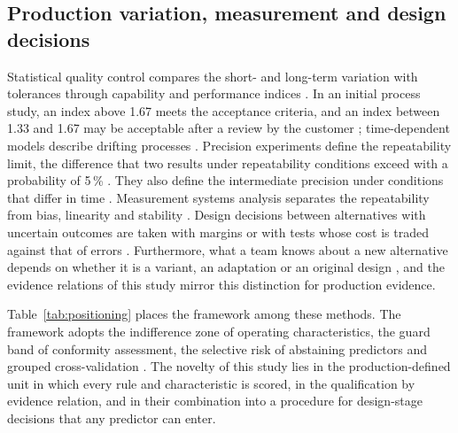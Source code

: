\documentclass[pdflatex,sn-basic,lineno]{sn-jnl}
\begin{document}
\subsection{Production variation, measurement and design decisions}

Statistical quality control compares the short- and long-term variation with tolerances through capability and performance indices \citep{montgomery2019introduction}. In an initial process study, an index above 1.67 meets the acceptance criteria, and an index between 1.33 and 1.67 may be acceptable after a review by the customer \citep{aiag2006production}; time-dependent models describe drifting processes \citep{iso2026process}. Precision experiments define the repeatability limit, the difference that two results under repeatability conditions exceed with a probability of 5\,\% \citep{iso2025repeatability}. They also define the intermediate precision under conditions that differ in time \citep{iso2023intermediate}. Measurement systems analysis separates the repeatability from bias, linearity and stability \citep{aiag2010measurement}. Design decisions between alternatives with uncertain outcomes \citep{hazelrigg1998framework} are taken with margins \citep{eckert2019design} or with tests whose cost is traded against that of errors \citep{thomke2001sequential, salado2018mathematical}. Furthermore, what a team knows about a new alternative depends on whether it is a variant, an adaptation or an original design \citep{pahl2007engineering}, and the evidence relations of this study mirror this distinction for production evidence.

Table~\ref{tab:positioning} places the framework among these methods. The framework adopts the indifference zone of operating characteristics, the guard band of conformity assessment, the selective risk of abstaining predictors and grouped cross-validation \citep{roberts2017cross}. The novelty of this study lies in the production-defined unit in which every rule and characteristic is scored, in the qualification by evidence relation, and in their combination into a procedure for design-stage decisions that any predictor can enter.
\end{document}
